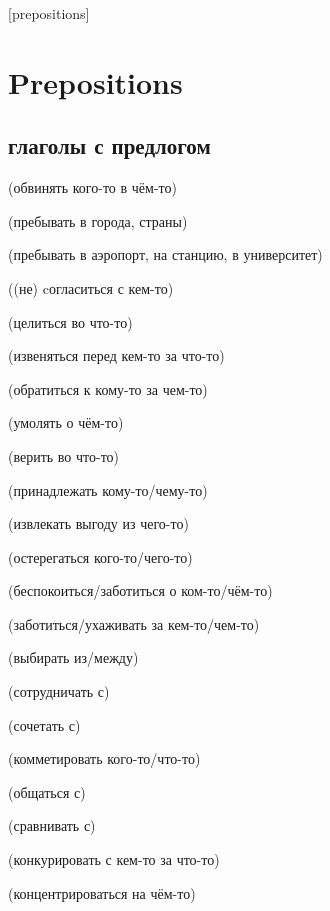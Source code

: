 [prepositions]

\section{Prepositions}
\subsection {глаголы с предлогом}
\begin{description}
    \item {} (обвинять кого-то в чём-то)
    \item {} (пребывать в города, страны)
    \item {} (пребывать в аэропорт, на станцию, в университет)
    \item {} ((не) cогласиться с кем-то)
    \item {} (целиться во что-то)
    \item {} (извеняться перед кем-то за что-то)
    \item {} (обратиться к кому-то за чем-то)
    \item {} (умолять о чём-то)
    \item {} (верить во что-то)
    \item {} (принадлежать кому-то/чему-то)
    \item {} (извлекать выгоду из чего-то)
    \item {} (остерегаться кого-то/чего-то)
    \item {} (беспокоиться/заботиться о ком-то/чём-то)
    \item {} (заботиться/ухаживать за кем-то/чем-то)
    \item {} (выбирать из/между)
    \item {} (сотрудничать с)
    \item {} (сочетать с)
    \item {} (комметировать кого-то/что-то)
    \item {} (общаться с)
    \item {} (сравнивать с)
    \item {} (конкурировать с кем-то за что-то)
    \item {} (концентрироваться на чём-то)
\end{description}
